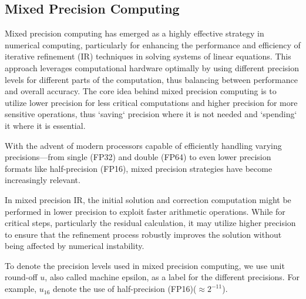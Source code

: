 \subsection{Mixed Precision Computing}
Mixed precision computing has emerged as a highly effective strategy in numerical computing, 
particularly for enhancing the performance and efficiency of iterative refinement (IR) techniques in solving systems of linear equations. 
This approach leverages computational hardware optimally by using different precision levels for different parts of the computation, 
thus balancing between performance and overall accuracy.
The core idea behind mixed precision computing is to utilize lower precision for less critical computations and higher precision for more sensitive operations, 
thus `saving` precision where it is not needed and `spending` it where it is essential.

With the advent of modern processors capable of efficiently handling varying precisions—from single (FP32) and double (FP64) to even lower precision formats like half-precision (FP16), 
mixed precision strategies have become increasingly relevant. 

In mixed precision IR, the initial solution and correction computation might be performed in lower precision to exploit faster arithmetic operations. 
While for critical steps, particularly the residual calculation, it may utilize higher precision to ensure that the refinement process robustly improves the solution without being affected by numerical instability.

To denote the precision levels used in mixed precision computing, 
we use unit round-off $u$, also called machine epsilon, as a label for the different precisions. 
For example, $u_{16}$ denote the use of half-precision (FP16)($\approx 2^{-11}$).
\clearpage